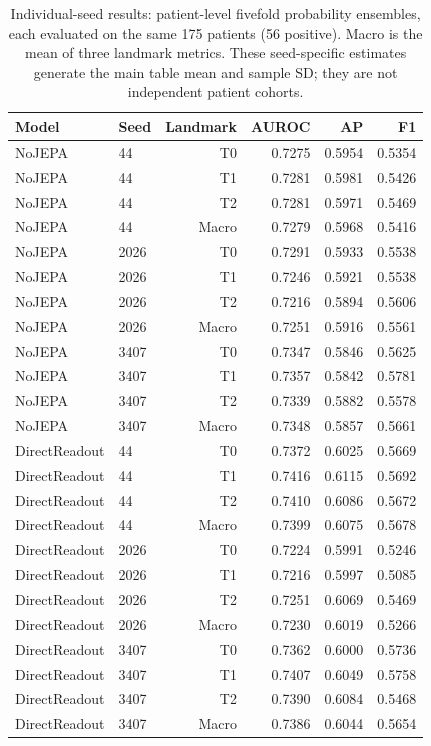 \begin{table}[t]
\centering
\small
\caption{Individual-seed results: patient-level fivefold probability ensembles, each evaluated on the same 175 patients (56 positive). Macro is the mean of three landmark metrics. These seed-specific estimates generate the main table mean and sample SD; they are not independent patient cohorts.}
\label{tab:seedresults}
\begin{tabular}{llrrrr}
\toprule
Model & Seed & Landmark & AUROC & AP & F1 \\
\midrule
NoJEPA & 44 & T0 & 0.7275 & 0.5954 & 0.5354 \\
NoJEPA & 44 & T1 & 0.7281 & 0.5981 & 0.5426 \\
NoJEPA & 44 & T2 & 0.7281 & 0.5971 & 0.5469 \\
NoJEPA & 44 & Macro & 0.7279 & 0.5968 & 0.5416 \\
NoJEPA & 2026 & T0 & 0.7291 & 0.5933 & 0.5538 \\
NoJEPA & 2026 & T1 & 0.7246 & 0.5921 & 0.5538 \\
NoJEPA & 2026 & T2 & 0.7216 & 0.5894 & 0.5606 \\
NoJEPA & 2026 & Macro & 0.7251 & 0.5916 & 0.5561 \\
NoJEPA & 3407 & T0 & 0.7347 & 0.5846 & 0.5625 \\
NoJEPA & 3407 & T1 & 0.7357 & 0.5842 & 0.5781 \\
NoJEPA & 3407 & T2 & 0.7339 & 0.5882 & 0.5578 \\
NoJEPA & 3407 & Macro & 0.7348 & 0.5857 & 0.5661 \\
DirectReadout & 44 & T0 & 0.7372 & 0.6025 & 0.5669 \\
DirectReadout & 44 & T1 & 0.7416 & 0.6115 & 0.5692 \\
DirectReadout & 44 & T2 & 0.7410 & 0.6086 & 0.5672 \\
DirectReadout & 44 & Macro & 0.7399 & 0.6075 & 0.5678 \\
DirectReadout & 2026 & T0 & 0.7224 & 0.5991 & 0.5246 \\
DirectReadout & 2026 & T1 & 0.7216 & 0.5997 & 0.5085 \\
DirectReadout & 2026 & T2 & 0.7251 & 0.6069 & 0.5469 \\
DirectReadout & 2026 & Macro & 0.7230 & 0.6019 & 0.5266 \\
DirectReadout & 3407 & T0 & 0.7362 & 0.6000 & 0.5736 \\
DirectReadout & 3407 & T1 & 0.7407 & 0.6049 & 0.5758 \\
DirectReadout & 3407 & T2 & 0.7390 & 0.6084 & 0.5468 \\
DirectReadout & 3407 & Macro & 0.7386 & 0.6044 & 0.5654 \\
\bottomrule
\end{tabular}
\end{table}
